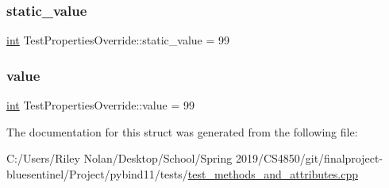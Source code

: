 \subsubsection{\texorpdfstring{static\_value}{static\_value}}
{\footnotesize\ttfamily \mbox{\hyperlink{warnings_8h_a74f207b5aa4ba51c3a2ad59b219a423b}{int}} Test\+Properties\+Override\+::static\+\_\+value = 99\hspace{0.3cm}{\ttfamily [static]}}

\mbox{\label{struct_test_properties_override_ac1fe1c62595fe8cf976615f8a12b332f}} 
\subsubsection{\texorpdfstring{value}{value}}
{\footnotesize\ttfamily \mbox{\hyperlink{warnings_8h_a74f207b5aa4ba51c3a2ad59b219a423b}{int}} Test\+Properties\+Override\+::value = 99}



The documentation for this struct was generated from the following file\+:\begin{DoxyCompactItemize}
\item 
C\+:/\+Users/\+Riley Nolan/\+Desktop/\+School/\+Spring 2019/\+C\+S4850/git/finalproject-\/bluesentinel/\+Project/pybind11/tests/\mbox{\hyperlink{test__methods__and__attributes_8cpp}{test\+\_\+methods\+\_\+and\+\_\+attributes.\+cpp}}\end{DoxyCompactItemize}
